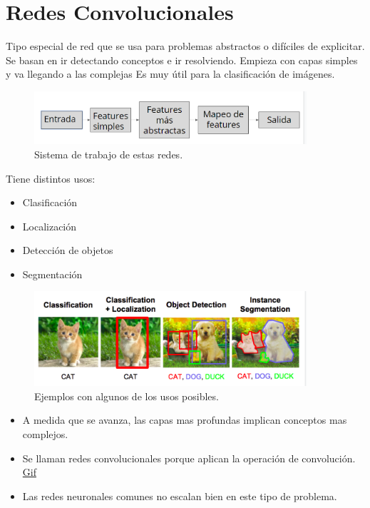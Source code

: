 \documentclass[titlepage,a4paper]{article}
\begin{document}
\section{Redes Convolucionales}
Tipo especial de red que se usa para problemas abstractos o difíciles de explicitar. Se basan en ir detectando conceptos e ir resolviendo. Empieza con capas simples y va llegando a las complejas Es muy útil para la clasificación de imágenes.

\begin{figure}[!htb]
    \centering
    \includegraphics[width=0.9\textwidth]{imagenesResumen/RedesConvolucionalesSistema.PNG}
    \caption{Sistema de trabajo de estas redes.}
\end{figure}

Tiene distintos usos:
\begin{itemize}
    \item Clasificación
    \item Localización
    \item Detección de objetos
    \item Segmentación
\end{itemize}

\begin{figure}[!htb]
    \centering
    \includegraphics[width=0.9\textwidth]{imagenesResumen/TiposDeUsosRedesConvolucionales.PNG}
    \caption{Ejemplos con algunos de los usos posibles.}
\end{figure}

\begin{itemize}
    \item A medida que se avanza, las capas mas profundas implican conceptos mas complejos.
    \item Se llaman redes convolucionales porque aplican la operación de convolución. \href{https://i1.wp.com/datasmarts.net/es/wp-content/uploads/2018/11/full_padding_no_strides_transposed.gif?resize=264\%2C300&ssl=1}{Gif}
    \item Las redes neuronales comunes no escalan bien en este tipo de problema.
\end{itemize}
\end{document}
